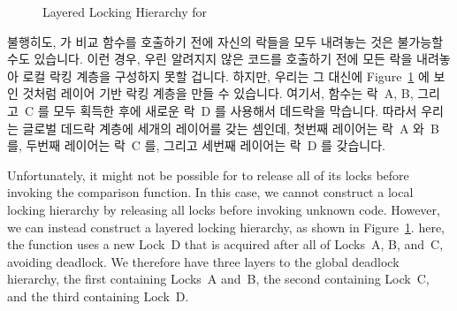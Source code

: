 \begin{figure}[tb]
\centering
{}
\caption{Layered Locking Hierarchy for }
\label{fig:locking:Layered Locking Hierarchy for qsort()}
\end{figure}

불행히도,  가 비교 함수를 호출하기 전에 자신의 락들을 모두 내려놓는
것은 불가능할 수도 있습니다.
이런 경우, 우린 알려지지 않은 코드를 호출하기 전에 모든 락을 내려놓아 로컬 락킹
계층을 구성하지 못할 겁니다.
하지만, 우리는 그 대신에
Figure~\ref{fig:locking:Layered Locking Hierarchy for qsort()} 에 보인 것처럼
레이어 기반 락킹 계층을 만들 수 있습니다.
여기서,  함수는 락~A, B, 그리고~C 를 모두 획득한 후에 새로운 락~D 를
사용해서 데드락을 막습니다.
따라서 우리는 글로벌 데드락 계층에 세개의 레이어를 갖는 셈인데, 첫번째 레이어는
락~A 와~B 를, 두번째 레이어는 락~C 를, 그리고 세번째 레이어는 락~D 를 갖습니다.

\iffalse

Unfortunately, it might not be possible for  to release
all of its locks before invoking the comparison function.
In this case, we cannot construct a local locking hierarchy by
releasing all locks before invoking unknown code.
However, we can instead construct a layered locking hierarchy, as shown in
Figure~\ref{fig:locking:Layered Locking Hierarchy for qsort()}.
here, the  function uses a new Lock~D that is acquired after
all of Locks~A, B, and~C, avoiding deadlock.
We therefore have three layers to the global deadlock hierarchy, the
first containing Locks~A and~B, the second containing Lock~C, and
the third containing Lock~D\@.

